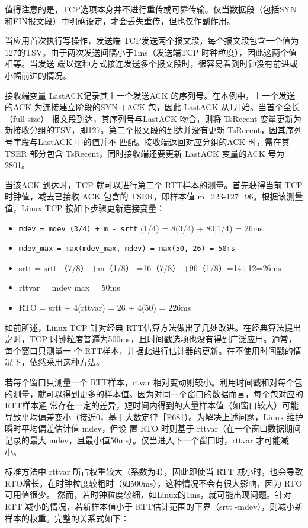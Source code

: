 值得注意的是，TCP选项本身并不进行重传或可靠传输。仅当数据段（包括SYN 和FIN报文段）中明确设定，才会丢失重传，但也仅作副作用。

当应用首次执行写操作，发送端 TCP发送两个报文段，每个报文段包含一个值为127的TSV。由于两次发送间隔小于1ms（发送端TCP
时钟粒度），因此这两个值相等。当发送
端以这种方式接连发送多个报文段时，很容易看到时钟没有前进或小幅前进的情况。

接收端变量 LastACK记录其上一个发送ACK 的序列号。在本例中，上一个发送的ACK 为连接建立阶段的SYN +ACK 包，因此
LastACK 从1开始。当首个全长（full-size）
报文段到达，其序列号与LastACK 吻合，则将 TsRecent 变量更新为新接收分组的TSV，即127。第二个报文段的到达并没有更新
TsRecent，因其序列号字段与LastACK 中的值并不
匹配。接收端返回对应分组的ACK 时，需在其 TSER 部分包含 TsRecent，同时接收端还要更新 LastACK 变量的ACK 号为2801。

当该ACK 到达时，TCP 就可以进行第二个 RTT样本的测量。首先获得当前 TCP 时钟值，减去已接收 ACK 包含的
TSER，即样本值 m=223-127=96。根据该测量值，Linux
TCP 按如下步骤更新连接变量：

\begin{itemize}
\item \verb|mdev = mdev (3/4) + m - srtt| (1/4) = 8(3/4) + 80|1/4) = 26ms|
\item \verb|mdev_max = max(mdev_max, mdev) = max(50, 26) = 50ms|
\item srtt = srtt （7/8） +m（1/8） =16（7/8） +96（1/8）=14+12=26ms
\item rttvar = mdev max = 50ms
\item RTO = srtt + 4(rttvar) = 26 + 4(50) = 226ms
\end{itemize}

如前所述，Linux TCP 针对经典 RTT估算方法做出了几处改进。在经典算法提出之时，TCP
时钟粒度普遍为500ms，且时间戳选项也没有得到广泛应用。通常，每个窗口只测量一
个 RTT样本，并据此进行估计器的更新。在不使用时间戳的情况下，依然采用这种方法。

若每个窗口只测量一个 RTT样本，rtvar
相对变动则较小。利用时间戳和对每个包的测量，就可以得到更多的样本值。因为对同一个窗口的数据而言，每个包对应的RTT样本通
常存在一定的差异，短时间内得到的大量样本值（如窗口较大）可能导致平均偏差变小（接近0，基于大数定律［F68］）。为解决上述问题，Linux
维护瞬时平均偏差估计值 mdev，但设
置 RTO 时则基于 rttvar（在一个窗口数据期间记录的最大 mdev，且最小值50ms）。仅当进入下一个窗口时，rttvar 才可能减小。

标准方法中 rttvar 所占权重较大（系数为4），因此即使当 RTT 减小时，也会导致
RTO增长。在时钟粒度较粗时（如500ms），这种情况不会有很大影响，因为 RTO 可用值很少。
然而，若时钟粒度较细，如Linux的1ms，就可能出现问题。针对 RTT 减小的情况，若新样本值小于 RTT估计范围的下界（srtt
-mdev），则减小新样本的权重。完整的关系式如下：

